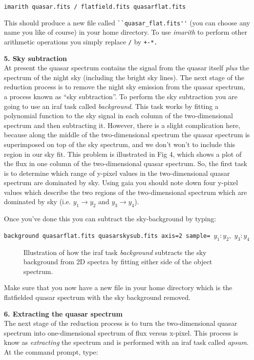 {\tt imarith quasar.fits \verb,/, flatfield.fits quasarflat.fits}

This should produce a new file called \verb,``quasar_flat.fits'', (you can
choose any name you like of course) in your home directory. To use
{\it imarith} to perform other arithmetic operations you simply
replace \verb,/, by \verb,+-*.,

{\large {\bf 5. Sky subtraction}}\\
At present the quasar spectrum contains the signal from the quasar
itself {\it plus} the spectrum of the night sky (including the bright
sky lines). The next stage of the reduction process is to remove the
night sky emission from the quasar spectrum, a process known as ``sky
subtraction''. To perform the sky subtraction you are going to use an
{\sc iraf} task called {\it background}. This task works by fitting a
polynomial function to the sky signal in each column of the
two-dimensional spectrum and then subtracting it. However, there is a
slight complication here, because along the middle of the
two-dimensional spectrum the quasar spectrum is superimposed on top of
the sky spectrum, and we don't won't to include this region in our sky
fit. This problem is illustrated in Fig 4, which shows a plot of the
flux in one column of the two-dimensional quasar spectrum. So, the
first task is to determine which range of y-pixel values in the
two-dimensional quasar spectrum are dominated by sky. Using {\sc gaia}
you should note down four y-pixel values which describe the
two regions of the two-dimensional spectrum which are dominated by sky
(i.e. $y_1 \rightarrow y_2$ and $y_3 \rightarrow y_4$).



Once you've done this you can subtract the sky-background by typing:

{\tt background quasarflat.fits quasarskysub.fits axis=2 sample= }$y_1:y_2,$ $y_3:y_4$


\begin{figure}
\centerline{}
\caption{Illustration of how the {\sc iraf} task {\it background}
subtracts the sky background from 2D spectra by fitting either side of
the object spectrum.}
\end{figure}

Make sure that you now have a new file in your home directory which is
the flatfielded quasar spectrum with the sky background removed.


{\large {\bf 6. Extracting the quasar spectrum }}\\
The next stage of the reduction process is to turn the two-dimensional
quasar spectrum into one-dimensional spectrum of flux versus
x-pixel. This process is know as {\it extracting} the spectrum and is
performed with an {\sc iraf} task called {\it apsum}. At the command
prompt, type:

